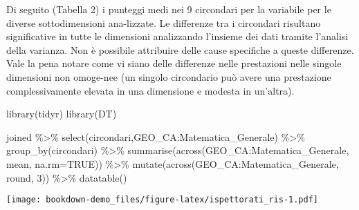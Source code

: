 \documentclass[
]{book}
\newenvironment{Shaded}{\begin{snugshade}}{\end{snugshade}}
\newcommand{\AttributeTok}[1]{\textcolor[rgb]{0.77,0.63,0.00}{#1}}
\newcommand{\ConstantTok}[1]{\textcolor[rgb]{0.00,0.00,0.00}{#1}}
\newcommand{\DecValTok}[1]{\textcolor[rgb]{0.00,0.00,0.81}{#1}}
\newcommand{\FunctionTok}[1]{\textcolor[rgb]{0.00,0.00,0.00}{#1}}
\newcommand{\NormalTok}[1]{#1}
\newcommand{\SpecialCharTok}[1]{\textcolor[rgb]{0.00,0.00,0.00}{#1}}
\begin{document}
Di seguito (Tabella 2) i punteggi medi nei 9 circondari per la variabile per le diverse sottodimensioni ana-lizzate. Le differenze tra i circondari risultano significative in tutte le dimensioni analizzando l'insieme dei dati tramite l'analisi della varianza. Non è possibile attribuire delle cause specifiche a queste differenze. Vale la pena notare come vi siano delle differenze nelle prestazioni nelle singole dimensioni non omoge-nee (un singolo circondario può avere una prestazione complessivamente elevata in una dimensione e modesta in un'altra).

\begin{Shaded}
\begin{Highlighting}[]
\FunctionTok{library}\NormalTok{(tidyr)}
\FunctionTok{library}\NormalTok{(DT)}

\NormalTok{joined }\SpecialCharTok{\%\textgreater{}\%} \FunctionTok{select}\NormalTok{(circondari,GEO\_CA}\SpecialCharTok{:}\NormalTok{Matematica\_Generale) }\SpecialCharTok{\%\textgreater{}\%}
  \FunctionTok{group\_by}\NormalTok{(circondari) }\SpecialCharTok{\%\textgreater{}\%} 
  \FunctionTok{summarise}\NormalTok{(}\FunctionTok{across}\NormalTok{(GEO\_CA}\SpecialCharTok{:}\NormalTok{Matematica\_Generale, mean, }\AttributeTok{na.rm=}\ConstantTok{TRUE}\NormalTok{)) }\SpecialCharTok{\%\textgreater{}\%}
  \FunctionTok{mutate}\NormalTok{(}\FunctionTok{across}\NormalTok{(GEO\_CA}\SpecialCharTok{:}\NormalTok{Matematica\_Generale, round, }\DecValTok{3}\NormalTok{))  }\SpecialCharTok{\%\textgreater{}\%} 
  \FunctionTok{datatable}\NormalTok{()}
\end{Highlighting}
\end{Shaded}

\texttt{[image: bookdown-demo\_files/figure-latex/ispettorati\_ris-1.pdf]}
\end{document}
